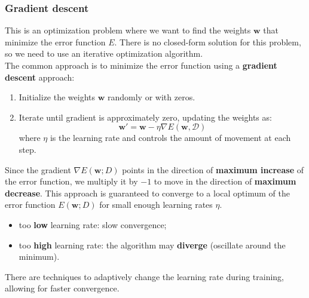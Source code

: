 \subsubsection{Gradient descent}
This is an optimization problem where we want to find the weights $\boldsymbol{w}$ that minimize the error function $E$.
There is no closed-form solution for this problem, so we need to use an iterative optimization algorithm.
\\The common approach is to minimize the error function using a \textbf{gradient descent} approach:
\begin{enumerate}
    \item Initialize the weights $\boldsymbol{w}$ randomly or with zeros.
    \item Iterate until gradient is approximately zero, updating the weights as:
    \begin{equation}
        \boldsymbol{w}' = \boldsymbol{w} - \eta \nabla E(\boldsymbol{w}, \mathcal{D})
    \end{equation}
    where $\eta$ is the learning rate and controls the amount of movement at each step.
\end{enumerate}
Since the gradient $\nabla E(\boldsymbol{w}; D)$ points in the direction of \textbf{maximum increase} of the error function,
we multiply it by $-1$ to move in the direction of \textbf{maximum decrease}.
This approach is guaranteed to converge to a local optimum of the error function $E(\boldsymbol{w}; D)$ for small enough learning rates $\eta$.
\begin{itemize}
    \item too \textbf{low} learning rate: slow convergence;
    \item too \textbf{high} learning rate: the algorithm may \textbf{diverge} (oscillate around the minimum).
\end{itemize}
There are techniques to adaptively change the learning rate during training, allowing for faster convergence.

